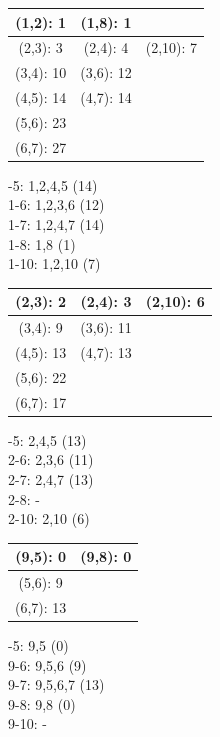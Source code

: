 \documentclass[listings]{labreport}
\begin{document}
\begin{multicols}{2}
\begin{tabular}{|c|c|c|}
\cline{1-2}
(1,2): 1 & (1,8): 1 \\ \hline
(2,3): 3 & (2,4): 4 & (2,10): 7 \\ \hline
(3,4): 10 & (3,6): 12 \\ \cline{1-2}
(4,5): 14 & (4,7): 14 \\ \cline{1-2}
(5,6): 23 \\ \cline{1-1}
(6,7): 27 \\ \cline{1-1}
\end{tabular}

-5: 1,2,4,5 (14) \\
1-6: 1,2,3,6 (12) \\
1-7: 1,2,4,7 (14) \\
1-8: 1,8 (1) \\
1-10: 1,2,10 (7) \\
\end{multicols}

\begin{multicols}{2}
\begin{tabular}{|c|c|c|}
\hline
(2,3): 2 & (2,4): 3 & (2,10): 6 \\ \hline
(3,4): 9 & (3,6): 11 \\ \cline{1-2}
(4,5): 13 & (4,7): 13 \\ \cline{1-2}
(5,6): 22 \\ \cline{1-1}
(6,7): 17 \\ \cline{1-1}
\end{tabular}

-5: 2,4,5 (13) \\
2-6: 2,3,6 (11) \\
2-7: 2,4,7 (13) \\
2-8: - \\
2-10: 2,10 (6) \\
\end{multicols}

\begin{multicols}{2}
\begin{tabular}{|c|c|}
\hline
(9,5): 0 & (9,8): 0 \\ \hline
(5,6): 9 \\ \cline{1-1}
(6,7): 13 \\ \cline{1-1}
\end{tabular}

\columnbreak 
{}-5: 9,5 (0) \\
9-6: 9,5,6 (9) \\
9-7: 9,5,6,7 (13) \\
9-8: 9,8 (0) \\
9-10: - \\
\end{multicols}
\end{document}
